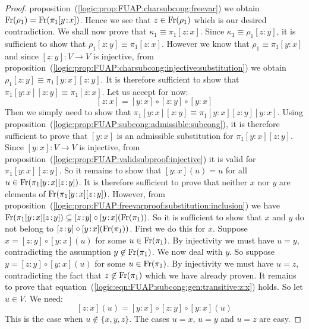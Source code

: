 \begin{proof}
proposition~(\ref{logic:prop:FUAP:charsubcong:freevar}) we obtain
$\mbox{\rm Fr}(\rho_{1})=\mbox{\rm Fr}(\pi_{1}[y\!:\!x])$. Hence we see that
$z\in\mbox{\rm Fr}(\rho_{1})$ which is our desired contradiction. We shall
now prove that $\kappa_{1}\equiv\pi_{1}[z\!:\!x]$. Since
$\kappa_{1}\equiv\rho_{1}[z\!:\!y]$, it is sufficient to show that
$\rho_{1}[z\!:\!y]\equiv\pi_{1}[z\!:\!x]$. However we know that
$\rho_{1}\equiv\pi_{1}[y\!:\!x]$ and since $[z\!:\!y]:V\to V$ is
injective, from
proposition~(\ref{logic:prop:FUAP:charsubcong:injective:substitution})
we obtain $\rho_{1}[z\!:\!y]\equiv\pi_{1}[y\!:\!x][z\!:\!y]$. It is
therefore sufficient to show that
$\pi_{1}[y\!:\!x][z\!:\!y]\equiv\pi_{1}[z\!:\!x]$. Let us accept for
now:
    \begin{equation}\label{logic:eqn:FUAP:subcong:gen:transitive:z:x}
    [z\!:\!x]=[y\!:\!x]\circ[z\!:\!y]\circ[y\!:\!x]
    \end{equation}
Then we simply need to show that
$\pi_{1}[y\!:\!x][z\!:\!y]\equiv\pi_{1}[y\!:\!x][z\!:\!y][y\!:\!x]$.
Using
proposition~(\ref{logic:prop:FUAP:subcong:admissible:subcong}), it
is therefore sufficient to prove that $[y\!:\!x]$ is an admissible
substitution for $\pi_{1}[y\!:\!x][z\!:\!y]$. Since $[y\!:\!x]:V\to
V$ is injective, from
proposition~(\ref{logic:prop:FUAP:validsubproof:injective}) it is
valid for $\pi_{1}[y\!:\!x][z\!:\!y]$. So it remains to show that
$[y\!:\!x](u)=u$ for all $u\in\mbox{\rm Fr}(\pi_{1}[y\!:\!x][z\!:\!y])$. It
is therefore sufficient to prove that neither $x$ nor $y$ are
elements of $\mbox{\rm Fr}(\pi_{1}[y\!:\!x][z\!:\!y])$. However, from
proposition~(\ref{logic:prop:FUAP:freevarproof:substitution:inclusion})
we have
$\free(\pi_{1}[y\!:\!x][z\!:\!y])\subseteq[z\!:\!y]\circ[y\!:\!x](\free(\pi_{1}))$.
So it is sufficient to show that $x$ and $y$ do not belong to
$[z\!:\!y]\circ[y\!:\!x](\mbox{\rm Fr}(\pi_{1}))$. First we do this for $x$.
Suppose $x=[z\!:\!y]\circ[y\!:\!x](u)$ for some
$u\in\mbox{\rm Fr}(\pi_{1})$. By injectivity we must have $u=y$,
contradicting the assumption $y\not\in\mbox{\rm Fr}(\pi_{1})$. We now deal
with $y$. So suppose $y=[z\!:\!y]\circ[y\!:\!x](u)$ for some
$u\in\mbox{\rm Fr}(\pi_{1})$. By injectivity we must have $u=z$,
contradicting the fact that $z\not\in\mbox{\rm Fr}(\pi_{1})$ which we have
already proven. It remains to prove that
equation~(\ref{logic:eqn:FUAP:subcong:gen:transitive:z:x}) holds. So
let $u\in V$. We need:
    \[
    [z\!:\!x](u)=[y\!:\!x]\circ[z\!:\!y]\circ[y\!:\!x](u)
    \]
This is the case when $u\not\in\{x,y,z\}$. The cases $u=x$, $u=y$
and $u=z$ are easy.
\end{proof}

